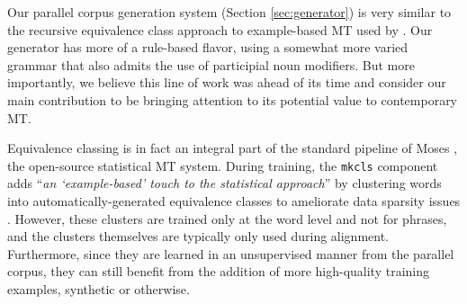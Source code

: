 Our parallel corpus generation system (Section \ref{sec:generator}) is very similar to the recursive equivalence class approach to example-based MT  used by . 
Our generator has more of a rule-based flavor, using a somewhat more varied grammar that also admits the use of participial noun modifiers.
But more importantly, we believe this line of work was ahead of its time and consider our main contribution to be bringing attention to its potential value to contemporary MT.  

Equivalence classing is in fact an integral part of the standard pipeline of Moses , the open-source statistical MT system. 
During training, the {\small \tt mkcls} component adds ``{\em an `example-based' touch to the statistical approach}'' by clustering words into automatically-generated equivalence classes to ameliorate data sparsity issues .
However, these clusters are trained only at the word level and not for phrases, and the clusters themselves are typically only used during alignment.
Furthermore, since they are learned in an unsupervised manner from the parallel corpus, they can still benefit from the addition of more high-quality training examples, synthetic or otherwise.


